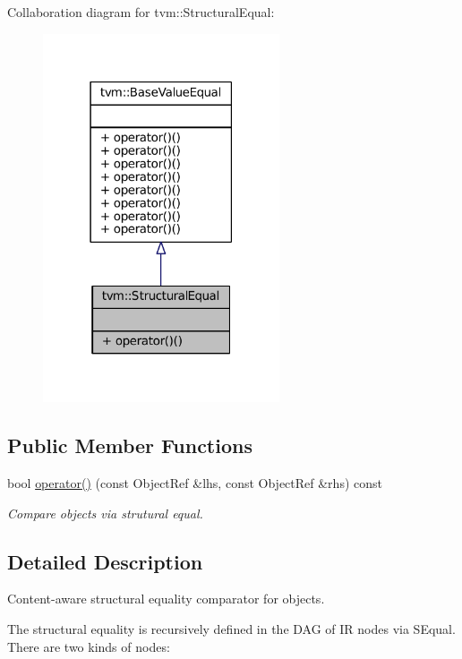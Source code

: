 Collaboration diagram for tvm\+:\+:Structural\+Equal\+:
\nopagebreak
\begin{figure}[H]
\begin{center}
\leavevmode
\includegraphics[width=198pt]{classtvm_1_1StructuralEqual__coll__graph}
\end{center}
\end{figure}
\subsection*{Public Member Functions}
\begin{DoxyCompactItemize}
\item 
bool \hyperlink{classtvm_1_1StructuralEqual_a39de30452ef65634ccc510e3507d7f20}{operator()} (const Object\+Ref \&lhs, const Object\+Ref \&rhs) const 
\begin{DoxyCompactList}\small\item\em Compare objects via strutural equal. \end{DoxyCompactList}\end{DoxyCompactItemize}


\subsection{Detailed Description}
Content-\/aware structural equality comparator for objects. 

The structural equality is recursively defined in the D\+AG of IR nodes via S\+Equal. There are two kinds of nodes\+:


